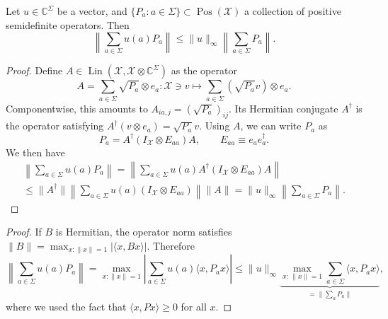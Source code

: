 \documentclass[12pt]{report}
\newcommand{\CC}{\mathbb{C}}
\newcommand{\calX}{{\mathcal{X}}}
\DeclareMathOperator{\Pos}{Pos}
\DeclareMathOperator{\Lin}{Lin}
\begin{document}
\begin{prop}
	Let $u\in\CC^\Sigma$ be a vector,
	and $\{P_a: a\in\Sigma\}\subset\Pos(\calX)$ a collection of positive semidefinite operators.
	Then
	\begin{equation}
		\left\|\sum_{a\in\Sigma} u(a)P_a\right\|
		\le \| u\|_\infty \left\| \sum_{a\in\Sigma}P_a\right\|.
	\end{equation}
\end{prop}
\begin{proof}
	Define $A\in\Lin(\calX,\calX\otimes\CC^\Sigma)$ as the operator
	\begin{equation}
		A = \sum_{a\in\Sigma} \sqrt{P_a}\otimes e_a
		: \calX\ni v\mapsto \sum_{a\in\Sigma} (\sqrt{P_a}v)\otimes e_a.
	\end{equation}
	Componentwise, this amounts to $A_{ia,j} = (\sqrt{P_a})_{ij}$.
	Its Hermitian conjugate $A^\dagger$ is the operator satisfying
		$A^\dagger(v\otimes e_a)
				= \sqrt{P_a}v$.
	Using $A$, we can write $P_a$ as
	\begin{equation}
		P_a = A^\dagger (I_{\calX}\otimes E_{aa})A,
		\qquad E_{aa}\equiv e_a e_a^\dagger.
	\end{equation}
	We then have
	\begin{equation}
	\begin{gathered}
		\left\|\sum_{a\in\Sigma} u(a) P_a\right\|
		= \left\|\sum_{a\in\Sigma} u(a) A^\dagger(I_{\calX}\otimes E_{aa})A\right\| \\
		\le \|A^\dagger\|
		\left\|\sum_{a\in\Sigma} u(a) (I_{\calX}\otimes E_{aa})\right\|
		\|A\|
		= \|u\|_\infty \left\|\sum_{a\in\Sigma}P_a\right\|.
	\end{gathered}
	\end{equation}
\end{proof}
\begin{proof}
	If $B$ is Hermitian, the operator norm satisfies
	$\|B\|=\max_{x:\|x\|=1} \lvert\langle x,Bx\rangle\rvert$.
	Therefore
	\begin{equation}
		\left\|\sum_{a\in\Sigma} u(a) P_a\right\|
		= \max_{x:\|x\|=1} \left\lvert
		\sum_{a\in\Sigma}
		u(a) \langle x, P_a x\rangle
		\right\rvert
		\le \|u\|_\infty
		\underbrace{
			\max_{x:\,\|x\|=1}
			\sum_{a\in\Sigma}\langle x,P_a x\rangle
		}_{=\|\sum_a P_a\|},
	\end{equation}
	where we used the fact that $\langle x,Px\rangle\ge0$ for all $x$.
\end{proof}
\end{document}
